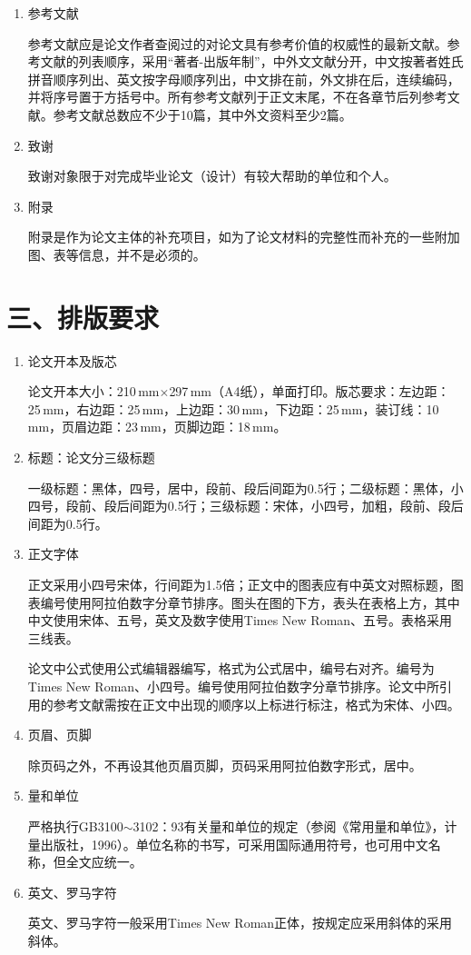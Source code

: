 \begin{enumerate}
\begin{enumerate}[label=(\arabic*)]
  结论是最终的、总体的结论，不是正文中各段的小节的简单重复。结论应该准确、完整、精练。如果不可能导出应有的结论，也可以没有结论而进行必要的讨论。
  \item 参考文献

  参考文献应是论文作者查阅过的对论文具有参考价值的权威性的最新文献。参考文献的列表顺序，采用``著者-出版年制''，中外文文献分开，中文按著者姓氏拼音顺序列出、英文按字母顺序列出，中文排在前，外文排在后，连续编码，并将序号置于方括号中。所有参考文献列于正文末尾，不在各章节后列参考文献。参考文献总数应不少于10篇，其中外文资料至少2篇。
  \item 致谢

  致谢对象限于对完成毕业论文（设计）有较大帮助的单位和个人。
  \item 附录

  附录是作为论文主体的补充项目，如为了论文材料的完整性而补充的一些附加图、表等信息，并不是必须的。
\end{enumerate}
\end{enumerate}
\section*{三、排版要求}
\begin{enumerate}
\item 论文开本及版芯

论文开本大小：210\,mm$\times$297\,mm（A4纸），单面打印。版芯要求：左边距：25\,mm，右边距：25\,mm，上边距：30\,mm，下边距：25\,mm，装订线：10\,mm，页眉边距：23\,mm，页脚边距：18\,mm。

\item 标题：论文分三级标题

一级标题：黑体，四号，居中，段前、段后间距为0.5行；二级标题：黑体，小四号，段前、段后间距为0.5行；三级标题：宋体，小四号，加粗，段前、段后间距为0.5行。

\item 正文字体

正文采用小四号宋体，行间距为1.5倍；正文中的图表应有中英文对照标题，图表编号使用阿拉伯数字分章节排序。图头在图的下方，表头在表格上方，其中中文使用宋体、五号，英文及数字使用Times New Roman、五号。表格采用三线表。

论文中公式使用公式编辑器编写，格式为公式居中，编号右对齐。编号为Times New Roman、小四号。编号使用阿拉伯数字分章节排序。论文中所引用的参考文献需按在正文中出现的顺序以上标进行标注，格式为宋体、小四。

\item 页眉、页脚

除页码之外，不再设其他页眉页脚，页码采用阿拉伯数字形式，居中。

\item 量和单位

严格执行GB3100$\sim$3102：93有关量和单位的规定（参阅《常用量和单位》，计量出版社，1996）。单位名称的书写，可采用国际通用符号，也可用中文名称，但全文应统一。

\item 英文、罗马字符

英文、罗马字符一般采用Times New Roman正体，按规定应采用斜体的采用斜体。
\end{enumerate}
